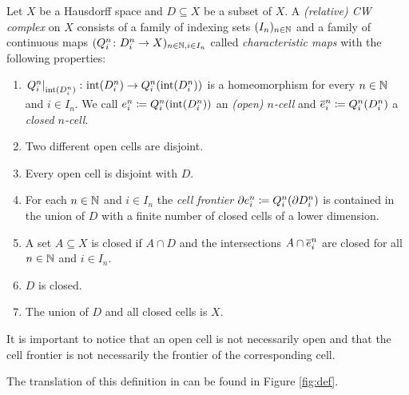 \begin{defi}
    Let $X$ be a Hausdorff space and $D \subseteq X$ be a subset of $X$. 
    A \emph{(relative) CW complex} on $X$ consists of a family of indexing sets $(I_n)_{n \in \bN}$ and a family of continuous maps $(Q_i^n \colon D_i^n \to X)_{n \in \bN, i \in I_n}$ called \emph{characteristic maps} with the following properties: 
    \begin{enumerate}
        \item $\restrict{Q_i^n}{\interior{D_i^n}} \colon \interior{D_i^n} \to Q_i^n(\interior{D_i^n})$ is a homeomorphism for every $n \in \bN$ and $i \in I_n$. We call $\openCell{n}{i} \coloneq Q_i^n(\interior{D_i^n})$ an \emph{(open) $n$-cell} and $\closedCell{n}{i} \coloneq Q_i^n(D_i^n)$ a \emph{closed $n$-cell}.
        \item Two different open cells are disjoint.
        \item Every open cell is disjoint with $D$.
        \item For each $n \in \bN$ and $i \in I_n$ the \emph{cell frontier} $\cellFrontier{n}{i} \coloneq Q_i^n(\boundary D_i^n)$ is contained in the union of $D$ with a finite number of closed cells of a lower dimension.
        \item A set $A \subseteq X$ is closed if $A \cap D$ and the intersections $A \cap \closedCell{n}{i}$ are closed for all $n \in \bN$ and $i \in I_n$.
        \item $D$ is closed. 
        \item The union of $D$ and all closed cells is $X$.
    \end{enumerate}
\end{defi}

It is important to notice that an open cell is not necessarily open and that the cell frontier is not necessarily the frontier of the corresponding cell.

The translation of this definition in \mathlib can be found in Figure \ref{fig:def}.

